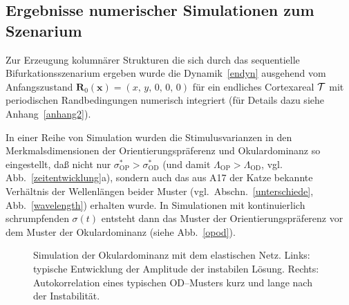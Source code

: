 \subsection{Ergebnisse numerischer Simulationen zum Szenarium}
\label{numerg}

Zur Erzeugung kolumnärer Strukturen die sich durch das sequentielle
Bifurkationsszenarium ergeben wurde die Dynamik~\eqref{endyn} ausgehend vom
Anfangszustand $\mathbf{R}_0(\mathbf{x}) = (x,\, y,\, 0,\, 0,\, 0) $ für
ein endliches Cortexareal $\cal T$ mit periodischen Randbedingungen
numerisch integriert (für Details dazu siehe Anhang~\ref{anhang2}).

In einer Reihe von Simulation wurden die Stimulusvarianzen in den
Merkmalsdimensionen der Orientierungspräferenz und Okulardominanz so
eingestellt, daß nicht nur $\sigma^\ast_{\text{OP}}>\sigma^\ast_{\text{OD}}$
(und damit $\Lambda_{\text{OP}} > \Lambda_{\text{OD}}$,
vgl. Abb.~\ref{zeitentwicklung}a), sondern auch
das aus A17 der Katze bekannte Verhältnis der Wellenlängen beider
Muster (vgl.~Abschn.~\ref{unterschiede}, Abb.~\ref{wavelength})
erhalten wurde. In Simulationen mit kontinuierlich schrumpfenden
$\sigma(t)$ entsteht dann das Muster der Orientierungspräferenz vor dem
Muster der Okulardominanz (siehe Abb.~\ref{opod}).

\begin{figure}[h!]
    \centering
    \caption{Simulation der Okulardominanz mit dem elastischen Netz. Links:
    typische Entwicklung der Amplitude der instabilen Lösung. Rechts:
    Autokorrelation eines typischen OD--Musters kurz und lange nach der
    Instabilität.}
    \label{umordnung}
\end{figure}


